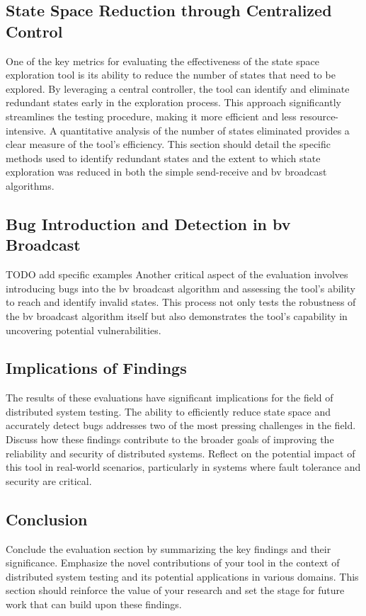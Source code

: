 \documentclass[a4paper,11pt,oneside]{report}
\begin{document}
\subsection{State Space Reduction through Centralized Control}
One of the key metrics for evaluating the effectiveness of the state space exploration tool is its ability to reduce the number of states that need to be explored. By leveraging a central controller, the tool can identify and eliminate redundant states early in the exploration process. This approach significantly streamlines the testing procedure, making it more efficient and less resource-intensive. A quantitative analysis of the number of states eliminated provides a clear measure of the tool's efficiency. This section should detail the specific methods used to identify redundant states and the extent to which state exploration was reduced in both the simple send-receive and bv broadcast algorithms.

\subsection{Bug Introduction and Detection in bv Broadcast}
TODO add specific examples
Another critical aspect of the evaluation involves introducing bugs into the bv broadcast algorithm and assessing the tool's ability to reach and identify invalid states. This process not only tests the robustness of the bv broadcast algorithm itself but also demonstrates the tool's capability in uncovering potential vulnerabilities. 

\subsection{Implications of Findings}
The results of these evaluations have significant implications for the field of distributed system testing. The ability to efficiently reduce state space and accurately detect bugs addresses two of the most pressing challenges in the field. Discuss how these findings contribute to the broader goals of improving the reliability and security of distributed systems. Reflect on the potential impact of this tool in real-world scenarios, particularly in systems where fault tolerance and security are critical.

\subsection{Conclusion}
Conclude the evaluation section by summarizing the key findings and their significance. Emphasize the novel contributions of your tool in the context of distributed system testing and its potential applications in various domains. This section should reinforce the value of your research and set the stage for future work that can build upon these findings.
\end{document}
